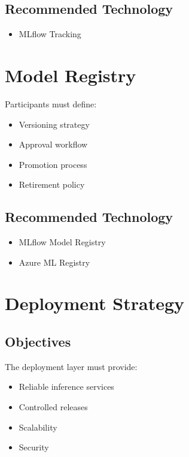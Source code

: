\subsection{Recommended Technology}

\begin{itemize}
    \item MLflow Tracking
\end{itemize}

\section{Model Registry}

Participants must define:

\begin{itemize}
    \item Versioning strategy
    \item Approval workflow
    \item Promotion process
    \item Retirement policy
\end{itemize}

\subsection{Recommended Technology}

\begin{itemize}
    \item MLflow Model Registry
    \item Azure ML Registry
\end{itemize}

\section{Deployment Strategy}

\subsection{Objectives}

The deployment layer must provide:

\begin{itemize}
    \item Reliable inference services
    \item Controlled releases
    \item Scalability
    \item Security
\end{itemize}

